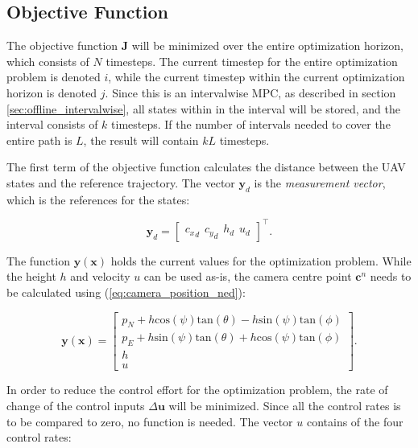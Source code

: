 \subsection{Objective Function}

The objective function $\mathbf{J}$ will be minimized over the entire optimization horizon, which consists of $N$ timesteps. The current timestep for the entire optimization problem is denoted $i$, while the current timestep within the current optimization horizon is denoted $j$. Since this is an intervalwise MPC, as described in section \ref{sec:offline_intervalwise}, all states within in the interval will be stored, and the interval consists of $k$ timesteps. If the number of intervals needed to cover the entire path is $L$, the result will contain $kL$ timesteps.

The first term of the objective function calculates the distance between the UAV states and the reference trajectory. The vector $\mathbf{y}_d$ is the \textit{measurement vector}, which is the references for the states:
	
\begin{equation}
	\mathbf{y}_d =
	\begin{bmatrix}
		{c_x}_d \hspace{5pt} {c_y}_d \hspace{5pt} h_d \hspace{5pt} u_d
	\end{bmatrix}^\intercal .
\end{equation}

The function $\mathbf{y}(\mathbf{x})$ holds the current values for the optimization problem. While the height $h$ and velocity $u$ can be used as-is, the camera centre point $\mathbf{c}^n$ needs to be calculated using (\ref{eq:camera_position_ned}):

\begin{equation}
	\mathbf{y}(\mathbf{x}) =
	\begin{bmatrix}
		p_N + h\text{cos}(\psi)\text{tan}(\theta) - h\text{sin}(\psi)\text{tan}(\phi)\\
		p_E + h\text{sin}(\psi)\text{tan}(\theta) + h\text{cos}(\psi)\text{tan}(\phi)\\
		h \\
		u
	\end{bmatrix}.
\end{equation}

In order to reduce the control effort for the optimization problem, the rate of change of the control inputs $\Delta\mathbf{u}$ will be minimized. Since all the control rates is to be compared to zero, no function is needed. The vector $u$ contains of the four control rates:


